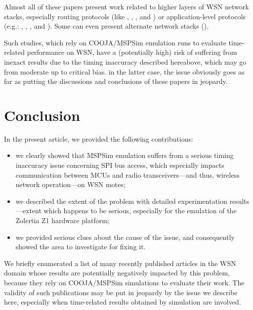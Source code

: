 \documentclass[10pt]{ewsn-proc}
\begin{document}
Almost all of these papers present work related to higher layers of
WSN network stacks, especially routing protocols (like
\cite{Constrain-Routing-Trees-2014},
\cite{Co-RPL-2014}, \cite{IETF-Routing-WSN-2014},
and \cite{Trickle-L2-2014})
or application-level protocols (e.g.: \cite{DINAS-2014},
\cite{Efficient-Distrib-Svc-Discovery-2014},
\cite{Visual-Sensor-Networks-2014}, and \cite{Key-Mgmt-2015}).
Some can even present alternate network stacks (\cite{TinySDN-2014}).

\medskip

Such studies, which rely on COOJA/MSPSim emulation runs to evaluate
time-related performance on WSN, have a (potentially high) risk of
suffering from inexact results due to the timing inaccuracy described
hereabove, which may go from moderate up to critical bias.
in the latter case, the issue obviously goes as far as putting
the discussions and conclusions of these papers in jeopardy.



\section{Conclusion}
\label{conclusion}

In the present article, we provided the following contributions:
\begin{itemize}
\item we clearly showed that MSPSim emulation suffers from a serious timing
inaccuracy issue concerning SPI bus access, which especially impacts
communication between MCUs and radio transceivers---and thus, wireless
network operation---on WSN motes;
\item we described the extent of the problem with detailed experimentation
results---extent which happens to be serious, especially for the emulation
of the Zolertia Z1 hardware platform;
\item we provided serious clues about the cause of the issue, and
consequently showed the area to investigate for fixing it.
\end{itemize}

We briefly enumerated a list of many recently published articles in the
WSN domain whose results are potentially negatively impacted by this problem,
because they rely on COOJA/MSPSim simulations to evaluate their work.
The validity of such publications may be put in jeopardy by the
issue we describe here, especially when time-related results
obtained by simulation are involved.
\end{document}
